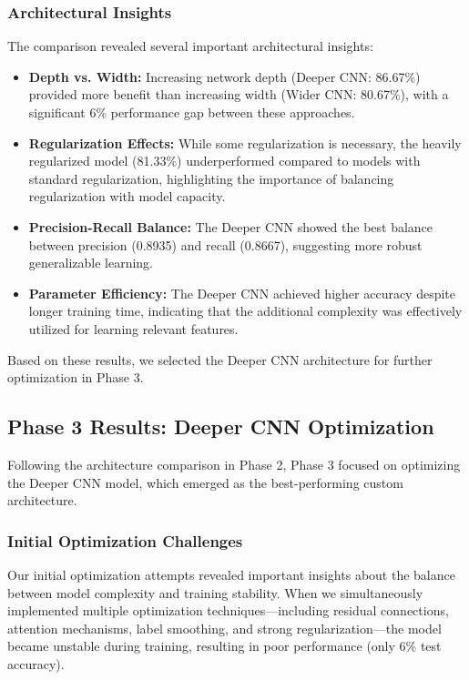 \subsubsection{Architectural Insights}
The comparison revealed several important architectural insights:
\begin{itemize}
    \item \textbf{Depth vs. Width:} Increasing network depth (Deeper CNN: 86.67\%) provided more benefit than increasing width (Wider CNN: 80.67\%), with a significant 6\% performance gap between these approaches.
    
    \item \textbf{Regularization Effects:} While some regularization is necessary, the heavily regularized model (81.33\%) underperformed compared to models with standard regularization, highlighting the importance of balancing regularization with model capacity.
    
    \item \textbf{Precision-Recall Balance:} The Deeper CNN showed the best balance between precision (0.8935) and recall (0.8667), suggesting more robust generalizable learning.
    
    \item \textbf{Parameter Efficiency:} The Deeper CNN achieved higher accuracy despite longer training time, indicating that the additional complexity was effectively utilized for learning relevant features.
\end{itemize}

Based on these results, we selected the Deeper CNN architecture for further optimization in Phase 3.

\subsection{Phase 3 Results: Deeper CNN Optimization}
Following the architecture comparison in Phase 2, Phase 3 focused on optimizing the Deeper CNN model, which emerged as the best-performing custom architecture.

\subsubsection{Initial Optimization Challenges}
Our initial optimization attempts revealed important insights about the balance between model complexity and training stability. When we simultaneously implemented multiple optimization techniques—including residual connections, attention mechanisms, label smoothing, and strong regularization—the model became unstable during training, resulting in poor performance (only 6\% test accuracy).

